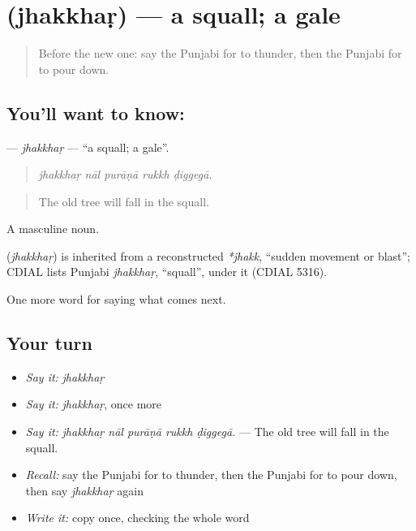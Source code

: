\section[\texorpdfstring{\pa{ਝੱਖੜ} (jhakkhaṛ)}{ਝੱਖੜ (jhakkhaṛ)}]{ (jhakkhaṛ) — a squall; a gale}

\label{lesson:PA-C286-jhakkhar}



\begin{quote}
Before the new one: say the Punjabi for to thunder, then the Punjabi for to pour down.
\end{quote}

\subsection*{You'll want to know: }
\textbf{} — \emph{jhakkhaṛ} — \textquotedblleft{}a squall; a gale\textquotedblright{}.

\begin{quote}
    
\end{quote}

\begin{quote}
\emph{jhakkhaṛ nāl purāṇā rukkh ḍiggegā.}
\end{quote}

\begin{quote}
The old tree will fall in the squall.
\end{quote}

A masculine noun.

\begin{cousinweb}
\textbf{} (\emph{jhakkhaṛ}) is inherited from a reconstructed \emph{*jhakk}, \textquotedblleft{}sudden movement or blast\textquotedblright{}; CDIAL lists Punjabi \emph{jhakkhaṛ}, \textquotedblleft{}squall\textquotedblright{}, under it (CDIAL 5316).
\end{cousinweb}

\begin{grammarlens}[title={What you've built}]
One more word for saying what comes next.
\end{grammarlens}

\subsection*{Your turn}
\begin{itemize}
\raggedright
  \item \emph{Say it:} \emph{jhakkhaṛ}
  \item \emph{Say it:} \emph{jhakkhaṛ}, once more
  \item \emph{Say it:} \emph{jhakkhaṛ nāl purāṇā rukkh ḍiggegā.} — The old tree will fall in the squall.
  \item \emph{Recall:} say the Punjabi for to thunder, then the Punjabi for to pour down, then say \emph{jhakkhaṛ} again
  \item \emph{Write it:} copy \textbf{} once, checking the whole word
\end{itemize}

